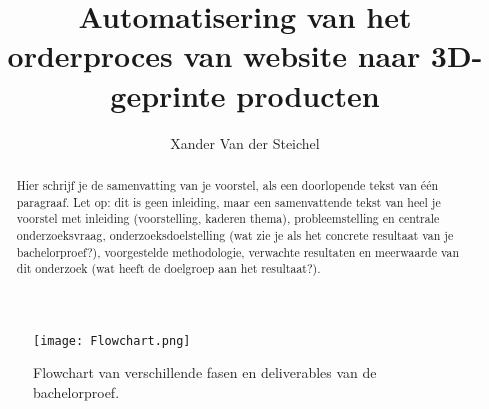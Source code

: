 \documentclass{hogent-article}
\title{Automatisering van het orderproces van website naar 3D-geprinte producten}
\author{Xander Van der Steichel}
\begin{document}
\begin{abstract}
  Hier schrijf je de samenvatting van je voorstel, als een doorlopende tekst van één paragraaf. Let op: dit is geen inleiding, maar een samenvattende tekst van heel je voorstel met inleiding (voorstelling, kaderen thema), probleemstelling en centrale onderzoeksvraag, onderzoeksdoelstelling (wat zie je als het concrete resultaat van je bachelorproef?), voorgestelde methodologie, verwachte resultaten en meerwaarde van dit onderzoek (wat heeft de doelgroep aan het resultaat?).
\end{abstract}

\tableofcontents



\printbibliography[heading=bibintoc]


\begin{figure}[H]  %
    \centering
    \texttt{[image: Flowchart.png]}  %
    \caption{Flowchart van verschillende fasen en deliverables van de bachelorproef.}
    \label{fig:flowchart}  %
\end{figure}

\vspace{1em}  %
\end{document}
